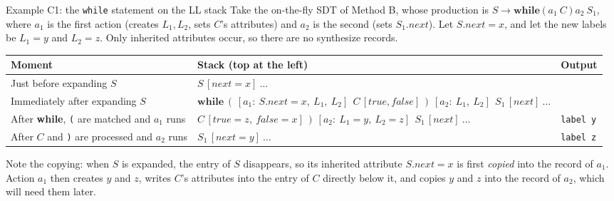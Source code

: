 \documentclass[11pt,a4paper]{article}
\newcommand{\tok}[1]{\ensuremath{\mathtt{#1}}}
\begin{document}
\begin{examplebox}{Example C1: the \texttt{while} statement on the LL stack}
Take the on-the-fly SDT of Method B, whose production is $S\to\mathbf{while}\ \tok{(}\ a_1\ C\ \tok{)}\ a_2\ S_1$, where $a_1$ is the first action (creates $L_1,L_2$, sets $C$'s attributes) and $a_2$ is the second (sets $S_1.next$). Let $S.next=x$, and let the new labels be $L_1=y$ and $L_2=z$. Only inherited attributes occur, so there are no synthesize records.
\begin{center}
\small
\begin{tabular}{@{}p{3.3cm} p{8.8cm} l@{}}
\toprule
\textbf{Moment} & \textbf{Stack (top at the left)} & \textbf{Output} \\ \midrule
Just before expanding $S$ & $S\,[next=x]\ \dots$ & \\
Immediately after expanding $S$ &
$\mathbf{while}\ \ \tok{(}\ \ [a_1:\ S.next=x,\ L_1,\ L_2]\ \ C\,[true,false]\ \ \tok{)}\ \ [a_2:\ L_1,\ L_2]\ \ S_1\,[next]\ \dots$ & \\
After \textbf{while}, \texttt{(} are matched and $a_1$ runs &
$C\,[true=z,\ false=x]\ \ \tok{)}\ \ [a_2:\ L_1=y,\ L_2=z]\ \ S_1\,[next]\ \dots$ & \texttt{label y} \\
After $C$ and \texttt{)} are processed and $a_2$ runs &
$S_1\,[next=y]\ \dots$ & \texttt{label z} \\ \bottomrule
\end{tabular}
\end{center}
Note the copying: when $S$ is expanded, the entry of $S$ disappears, so its inherited attribute $S.next=x$ is first \emph{copied} into the record of $a_1$. Action $a_1$ then creates $y$ and $z$, writes $C$'s attributes into the entry of $C$ directly below it, and copies $y$ and $z$ into the record of $a_2$, which will need them later.
\end{examplebox}
\end{document}
